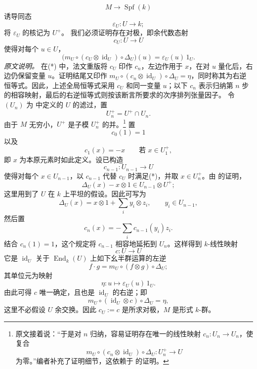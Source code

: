 \[
  M\longrightarrow\operatorname{Spf}(k)
\]
诱导同态
\[
  \varepsilon_U:U\longrightarrow k;
\]
将 \(\varepsilon_U\) 的核记为 \(U^+\)。
我们必须证明存在对极，即余代数态射
\[
  c_U:U\longrightarrow U
\]
使得对每个 \(u\in U\)，
\begin{equation}
  \bigl(m_U\circ(c_U\otimes\operatorname{id}_U)
    \circ\Delta_U\bigr)(u)
  =
  \varepsilon_U(u)\,1_U.
  \tag{*}
  \label{sga3:VIIB:2.7:antipode-left-identity}
\end{equation}
\label{sga3:VIIB:2.7:antipode-source-note}
\noindent\textit{原文说明。}\enspace
在\textup{(*)} 中，法文重版将 \(c_U\) 印作 \(c_n\)，左边作用于 \(x\)，在对 \(u\) 量化后，右边仍保留变量 \(u\)。证明结尾又印作 \(m_U\circ(c_n\otimes\operatorname{id}_U)\circ\Delta_U=\eta\)，同时称其为右逆恒等式。因此，上述全局恒等式采用 \(c_U\) 和同一变量 \(u\)；以下 \(c_n\) 表示归纳第 \(n\) 步的相容映射，最后的右逆恒等式则按该断言所要求的次序排列张量因子。
令 \((U_n)\) 为  中定义的 \(U\) 的滤过，置
\[
  U_n^+=U^+\cap U_n.
\]
由于 \(M\) 无穷小，\(U^+\) 是子模 \(U_n^+\) 的并。\footnote{%
\label{sga3:VIIB:nde:114}原文接着说：“于是对 \(n\) 归纳，容易证明存在唯一的线性映射 \(c_n:U_n\to U_n\)，使复合
\[
  m_U\circ(c_n\otimes\operatorname{id}_U)\circ\Delta_U:
  U_n^+\longrightarrow U
\]
为零。”编者补充了证明细节，这依赖于 的证明。}
置
\[
  c_0(1)=1
\]
以及
\[
  c_1(x)=-x
  \qquad\text{若 }x\in U_1^+,
\]
即 \(x\) 为本原元素时如此定义。设已构造
\[
  c_{n-1}:U_{n-1}\longrightarrow U
\]
使得对每个 \(x\in U_{n-1}\)，以 \(c_{n-1}\) 代替 \(c_U\) 时满足\textup{(*)}，并取 \(x\in U_n^+\)。由 的证明，
\[
  \Delta_U(x)-x\otimes1
  \in
  U_{n-1}\otimes U^+;
\]
这里用到了 \(U\) 在 \(k\) 上平坦的假设。因此可写为
\[
  \Delta_U(x)
  =
  x\otimes1+\sum_i y_i\otimes z_i,
  \qquad
  y_i\in U_{n-1},
\]
然后置
\[
  c_n(x)
  =
  -\sum_i c_{n-1}(y_i)z_i.
\]
结合 \(c_n(1)=1\)，这个规定将 \(c_{n-1}\) 相容地延拓到 \(U_n\)。这样得到 \(k\)-线性映射
\[
  c:U\longrightarrow U
\]
它是 \(\operatorname{id}_U\) 关于 \(\operatorname{End}_k(U)\) 上如下幺半群运算的左逆
\[
  f\mathbin{\cdot}g
  =
  m_U\circ(f\otimes g)\circ\Delta_U;
\]
其单位元为映射
\[
  \eta:u\longmapsto\varepsilon_U(u)\,1_U.
\]
由此可得 \(c\) 唯一确定，且也是 \(\operatorname{id}_U\) 的右逆；即
\[
  m_U\circ(\operatorname{id}_U\otimes c)\circ\Delta_U
  =
  \eta,
\]
这里不必假设 \(U\) 余交换。因此 \(c_U:=c\) 是所求对极，\(M\) 是形式 \(k\)-群。
